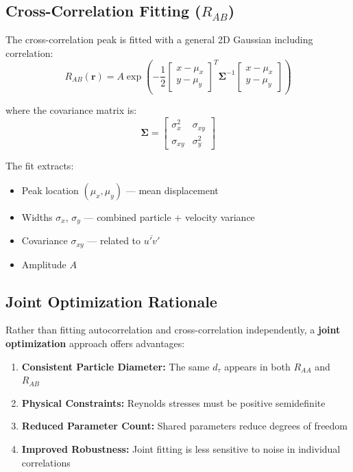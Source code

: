 \documentclass[11pt,a4paper]{article}
\begin{document}
\subsection{Cross-Correlation Fitting ($R_{AB}$)}

The cross-correlation peak is fitted with a general 2D Gaussian including correlation:
\begin{equation}
    R_{AB}(\mathbf{r}) = A \exp\left( -\frac{1}{2} \begin{bmatrix} x - \mu_x \\ y - \mu_y \end{bmatrix}^T \boldsymbol{\Sigma}^{-1} \begin{bmatrix} x - \mu_x \\ y - \mu_y \end{bmatrix} \right)
\end{equation}

where the covariance matrix is:
\begin{equation}
    \boldsymbol{\Sigma} = \begin{bmatrix} \sigma_x^2 & \sigma_{xy} \\ \sigma_{xy} & \sigma_y^2 \end{bmatrix}
\end{equation}

The fit extracts:
\begin{itemize}
    \item Peak location $(\mu_x, \mu_y)$ --- mean displacement
    \item Widths $\sigma_x$, $\sigma_y$ --- combined particle + velocity variance
    \item Covariance $\sigma_{xy}$ --- related to $\overline{u'v'}$
    \item Amplitude $A$
\end{itemize}

\subsection{Joint Optimization Rationale}

Rather than fitting autocorrelation and cross-correlation independently, a \textbf{joint optimization} approach offers advantages:

\begin{enumerate}
    \item \textbf{Consistent Particle Diameter:} The same $d_\tau$ appears in both $R_{AA}$ and $R_{AB}$
    \item \textbf{Physical Constraints:} Reynolds stresses must be positive semidefinite
    \item \textbf{Reduced Parameter Count:} Shared parameters reduce degrees of freedom
    \item \textbf{Improved Robustness:} Joint fitting is less sensitive to noise in individual correlations
\end{enumerate}
\end{document}
